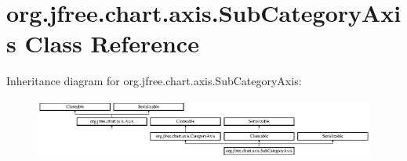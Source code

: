 \hypertarget{classorg_1_1jfree_1_1chart_1_1axis_1_1_sub_category_axis}{}\section{org.\+jfree.\+chart.\+axis.\+Sub\+Category\+Axis Class Reference}
\label{classorg_1_1jfree_1_1chart_1_1axis_1_1_sub_category_axis}
Inheritance diagram for org.\+jfree.\+chart.\+axis.\+Sub\+Category\+Axis\+:\begin{figure}[H]
\begin{center}
\leavevmode
\includegraphics[height=1.947826cm]{classorg_1_1jfree_1_1chart_1_1axis_1_1_sub_category_axis}
\end{center}
\end{figure}
